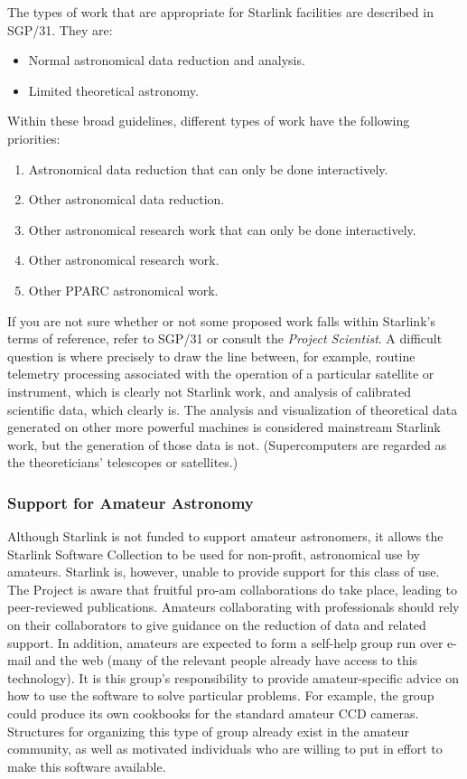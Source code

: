 \documentclass[twoside,11pt]{article}
\newcommand{\xref}[3]{#1}
\begin{document}
The types of work that are appropriate for Starlink facilities are described
in \xref{SGP/31}{sgp31}{}.
They are:

\begin{itemize}
\item Normal astronomical data reduction and analysis.
\item Limited theoretical astronomy.
\end{itemize}

Within these broad guidelines, different types of work have the following
priorities:

\begin{enumerate}
\item Astronomical data reduction that can only be done interactively.
\item Other astronomical data reduction.
\item Other astronomical research work that can only be done interactively.
\item Other astronomical research work.
\item Other PPARC astronomical work.
\end{enumerate}

If you are not sure whether or not some proposed work falls within Starlink's
terms of reference, refer to
\xref{SGP/31}{sgp31}{}
or consult the {\em Project Scientist}.
A difficult question is where precisely to draw the line between, for
example, routine telemetry processing associated with the operation of
a particular satellite or instrument, which is clearly not Starlink
work, and analysis of calibrated scientific data, which clearly is.
The analysis and visualization of theoretical data generated on other more
powerful machines is considered mainstream Starlink work, but the generation of
those data is not.
(Supercomputers are regarded as the theoreticians' telescopes or satellites.)

\subsubsection{\label{amateurs}Support for Amateur Astronomy}

Although Starlink is not funded to support amateur astronomers, it allows the
Starlink Software Collection to be used for non-profit, astronomical use by
amateurs.
Starlink is, however, unable to provide support for this class of use.
The Project is aware that fruitful pro-am collaborations do take place,
leading to peer-reviewed publications.
Amateurs collaborating with professionals should rely on their collaborators
to give guidance on the reduction of data and related support.
In addition, amateurs are expected to form a self-help group run over e-mail
and the web (many of the relevant people already have access to this
technology).
It is this group's responsibility to provide amateur-specific advice on how to
use the software to solve particular problems.
For example, the group could produce its own cookbooks for the standard amateur
CCD cameras.
Structures for organizing this type of group already exist in the amateur
community, as well as motivated individuals who are willing to put in effort to
make this software available.
\end{document}
